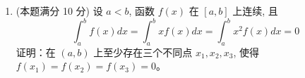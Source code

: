 \begin{enumerate}



\item 
(本题满分 10 分)	
设 $a<b$, 函数 $f(x)$ 在 $[a, b]$ 上连续, 且
\[
\int_{a}^{b} f(x) d x=\int_{a}^{b} x f(x) d x=\int_{a}^{b} x^{2} f(x) d x=0
\]
证明：在 $(a, b)$ 上至少存在三个不同点 $x_{1}, x_{2}, x_{3}$, 使得 $f\left(x_{1}\right)=f\left(x_{2}\right)=f\left(x_{3}\right)=0$。






	
\end{enumerate}

